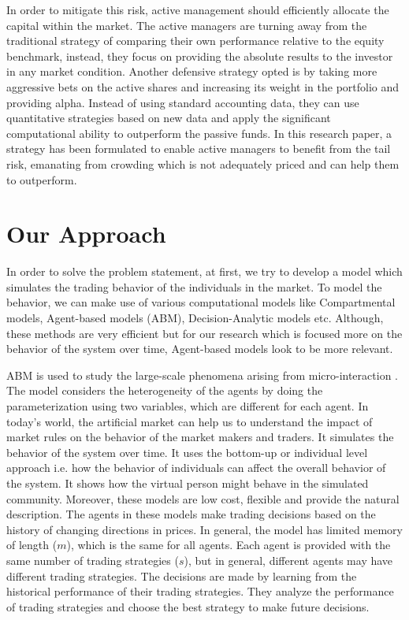In order to mitigate this risk, active management should efficiently allocate the capital within the market. The active managers are turning away from the traditional strategy of comparing their own performance relative to the equity benchmark, instead, they focus on providing the absolute results to the investor in any market condition. Another defensive strategy opted is by taking more aggressive bets on the active shares and increasing its weight in the portfolio and providing alpha. Instead of using standard accounting data, they can use quantitative strategies based on new data and apply the significant computational ability to outperform the passive funds. In this research paper, a strategy has been formulated to enable active managers to benefit from the tail risk, emanating from crowding which is not adequately priced and can help them to outperform.

\section{Our Approach}
In order to solve the problem statement, at first, we try to develop a model which simulates the trading behavior of the individuals in the market. To model the behavior, we can make use of various computational models like Compartmental models, Agent-based models (ABM), Decision-Analytic models etc. Although, these methods are very efficient but for our research which is focused more on the behavior of the system over time, Agent-based models look to be more relevant.

ABM is used to study the large-scale phenomena arising from micro-interaction \cite{abm_ref}. The model considers the heterogeneity of the agents by doing the parameterization using two variables, which are different for each agent. In today's world, the artificial market can help us to understand the impact of market rules on the behavior of the market makers and traders. It simulates the behavior of the system over time. It uses the bottom-up or individual level approach i.e. how the behavior of individuals can affect the overall behavior of the system. It shows how the virtual person might behave in the simulated community. Moreover, these models are low cost, flexible and provide the natural description. The agents in these models make trading decisions based on the history of changing directions in prices. In general, the model has limited memory of length ($m$), which is the same for all agents. Each agent is provided with the same number of trading strategies ($s$), but in general, different agents may have different trading strategies. The decisions are made by learning from the historical performance of their trading strategies. They analyze the performance of trading strategies and choose the best strategy to make future decisions. 

